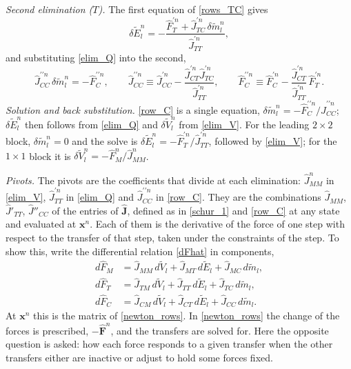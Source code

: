 \emph{Second elimination ($T$).} The first equation of \eqref{rows_TC} gives
\begin{equation}\label{elim_Q}
\delta\tilde{E}_l^n=-\frac{\hat{F}^{\prime n}_T+\hat{J}^{\prime n}_{TC}\,\delta\tilde{m}_l^n}{\hat{J}^{\prime n}_{TT}},
\end{equation}
and substituting \eqref{elim_Q} into the second,
\begin{equation}\label{row_C}
\hat{J}^{\prime\prime n}_{CC}\,\delta\tilde{m}_l^n=-\hat{F}^{\prime\prime n}_C,\qquad
\hat{J}^{\prime\prime n}_{CC}\equiv\hat{J}^{\prime n}_{CC}-\frac{\hat{J}^{\prime n}_{CT}\hat{J}^{\prime n}_{TC}}{\hat{J}^{\prime n}_{TT}},\qquad
\hat{F}^{\prime\prime n}_C\equiv \hat{F}^{\prime n}_C-\frac{\hat{J}^{\prime n}_{CT}}{\hat{J}^{\prime n}_{TT}}\,\hat{F}^{\prime n}_T .
\end{equation}
\emph{Solution and back substitution.} \eqref{row_C} is a single equation, $\delta\tilde{m}_l^n=-\hat{F}^{\prime\prime n}_C/\hat{J}^{\prime\prime n}_{CC}$; $\delta\tilde{E}_l^n$ then follows from \eqref{elim_Q} and $\delta\tilde{V}_l^n$ from \eqref{elim_V}. For the leading $2\times2$ block, $\delta\tilde{m}_l^n=0$ and the solve is $\delta\tilde{E}_l^n=-\hat{F}^{\prime n}_T/\hat{J}^{\prime n}_{TT}$, followed by \eqref{elim_V}; for the $1\times1$ block it is $\delta\tilde{V}_l^n=-\hat{F}^n_M/\hat{J}^n_{MM}$.

\emph{Pivots.} The pivots are the coefficients that divide at each elimination: $\hat{J}^n_{MM}$ in \eqref{elim_V}, $\hat{J}^{\prime n}_{TT}$ in \eqref{elim_Q} and $\hat{J}^{\prime\prime n}_{CC}$ in \eqref{row_C}. They are the combinations $\hat{J}_{MM}$, $\hat{J}'_{TT}$, $\hat{J}''_{CC}$ of the entries of $\hat{\boldsymbol{J}}$, defined as in \eqref{schur_1} and \eqref{row_C} at any state and evaluated at $\boldsymbol{x}^n$. Each of them is the derivative of the force of one step with respect to the transfer of that step, taken under the constraints of the step. To show this, write the differential relation \eqref{dFhat} in components,
\begin{equation}\label{dFhat_rows}
\begin{aligned}
d\hat{F}_M&=\hat{J}_{MM}\,d\tilde{V}_l+\hat{J}_{MT}\,d\tilde{E}_l+\hat{J}_{MC}\,d\tilde{m}_l,\\
d\hat{F}_T&=\hat{J}_{TM}\,d\tilde{V}_l+\hat{J}_{TT}\,d\tilde{E}_l+\hat{J}_{TC}\,d\tilde{m}_l,\\
d\hat{F}_C&=\hat{J}_{CM}\,d\tilde{V}_l+\hat{J}_{CT}\,d\tilde{E}_l+\hat{J}_{CC}\,d\tilde{m}_l .
\end{aligned}
\end{equation}
At $\boldsymbol{x}^n$ this is the matrix of \eqref{newton_rows}. In \eqref{newton_rows} the change of the forces is prescribed, $-\hat{\boldsymbol{F}}^n$, and the transfers are solved for. Here the opposite question is asked: how each force responds to a given transfer when the other transfers either are inactive or adjust to hold some forces fixed.

